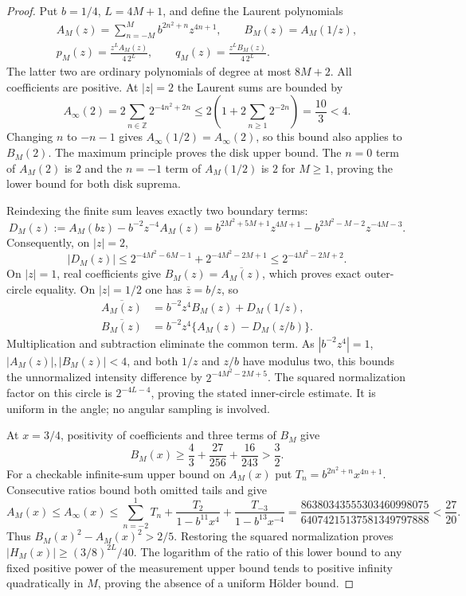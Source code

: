 \begin{proof}
Put $b=1/4$, $L=4M+1$, and define the Laurent polynomials
\[
 \begin{gathered}
 A_M(z)=\sum_{n=-M}^M b^{2n^2+n}z^{4n+1},\qquad B_M(z)=A_M(1/z),\\
 p_M(z)=\frac{z^L A_M(z)}{4\,2^L},\qquad
 q_M(z)=\frac{z^L B_M(z)}{4\,2^L}.
 \end{gathered}
\]
The latter two are ordinary polynomials of degree at most $8M+2$.
All coefficients are positive. At $|z|=2$ the Laurent sums are bounded by
\[
 A_\infty(2)=2\sum_{n\in\mathbb Z}2^{-4n^2+2n}
 \le2\left(1+2\sum_{n\ge1}2^{-2n}\right)=\frac{10}3<4.
\]
Changing $n$ to $-n-1$ gives $A_\infty(1/2)=A_\infty(2)$, so this bound
also applies to $B_M(2)$. The maximum principle proves the disk upper bound.
The $n=0$ term of $A_M(2)$ is $2$ and the $n=-1$ term of $A_M(1/2)$ is
$2$ for $M\ge1$, proving the lower bound for both disk suprema.

Reindexing the finite sum leaves exactly two boundary terms:
\begin{equation}\label{eq:theta-truncation-defect}
 D_M(z):=A_M(bz)-b^{-2}z^{-4}A_M(z)
 =b^{2M^2+5M+1}z^{4M+1}-b^{2M^2-M-2}z^{-4M-3}.
\end{equation}
Consequently, on $|z|=2$,
\[
 |D_M(z)|\le2^{-4M^2-6M-1}+2^{-4M^2-2M+1}
           \le2^{-4M^2-2M+2}.
\]
On $|z|=1$, real coefficients give $B_M(z)=\overline{A_M(z)}$, which proves
exact outer-circle equality. On $|z|=1/2$ one has $\overline z=b/z$, so
\[
 \begin{split}
 \overline{A_M(z)}&=b^{-2}z^4B_M(z)+D_M(1/z),\\
 \overline{B_M(z)}&=b^{-2}z^4\{A_M(z)-D_M(z/b)\}.
 \end{split}
\]
Multiplication and subtraction eliminate the common term. As
$|b^{-2}z^4|=1$, $|A_M(z)|,|B_M(z)|<4$, and both $1/z$ and $z/b$ have
modulus two, this bounds the unnormalized intensity difference by
$2^{-4M^2-2M+5}$. The squared normalization factor on this circle is
$2^{-4L-4}$, proving the stated inner-circle estimate. It is uniform in the
angle; no angular sampling is involved.

At $x=3/4$, positivity of coefficients and three terms of $B_M$ give
\[
 B_M(x)\ge\frac43+\frac{27}{256}+\frac{16}{243}>\frac32.
\]
For a checkable infinite-sum upper bound on $A_M(x)$ put
$T_n=b^{2n^2+n}x^{4n+1}$. Consecutive ratios bound both omitted tails and give
\[
 A_M(x)\le A_\infty(x)
 \le\sum_{n=-2}^{1}T_n+
       \frac{T_2}{1-b^{11}x^4}+\frac{T_{-3}}{1-b^{13}x^{-4}}
 =\frac{86380343555303460998075}{64074215137581349797888}
 <\frac{27}{20}.
\]
Thus $B_M(x)^2-A_M(x)^2>2/5$. Restoring the squared normalization proves
$|H_M(x)|\ge (3/8)^{2L}/40$. The logarithm of the ratio of this lower bound
to any fixed positive power of the measurement upper bound tends to positive
infinity quadratically in $M$, proving the absence of a uniform H\"older bound.
\end{proof}

